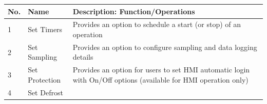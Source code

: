 \begin{longtable}[]{@{}lll@{}}
\toprule
\begin{minipage}[b]{0.04\columnwidth}\raggedright
No.\strut
\end{minipage} & \begin{minipage}[b]{0.23\columnwidth}\raggedright
Name\strut
\end{minipage} & \begin{minipage}[b]{0.65\columnwidth}\raggedright
Description: Function/Operations\strut
\end{minipage}\tabularnewline
\midrule
\endhead
\begin{minipage}[t]{0.04\columnwidth}\raggedright
1\strut
\end{minipage} & \begin{minipage}[t]{0.23\columnwidth}\raggedright
Set Timers\strut
\end{minipage} & \begin{minipage}[t]{0.65\columnwidth}\raggedright
Provides an option to schedule a start (or stop) of an operation\strut
\end{minipage}\tabularnewline
\begin{minipage}[t]{0.04\columnwidth}\raggedright
2\strut
\end{minipage} & \begin{minipage}[t]{0.23\columnwidth}\raggedright
Set Sampling\strut
\end{minipage} & \begin{minipage}[t]{0.65\columnwidth}\raggedright
Provides an option to configure sampling and data logging details\strut
\end{minipage}\tabularnewline
\begin{minipage}[t]{0.04\columnwidth}\raggedright
3\strut
\end{minipage} & \begin{minipage}[t]{0.23\columnwidth}\raggedright
Set Protection\strut
\end{minipage} & \begin{minipage}[t]{0.65\columnwidth}\raggedright
Provides an option for users to set HMI automatic login with On/Off
options (available for HMI operation only)\strut
\end{minipage}\tabularnewline
\begin{minipage}[t]{0.04\columnwidth}\raggedright
4\strut
\end{minipage} & \begin{minipage}[t]{0.23\columnwidth}\raggedright
Set Defrost\strut
\end{minipage} & \begin{minipage}[t]{0.65\columnwidth}\raggedright

\end{minipage}
\end{longtable}
